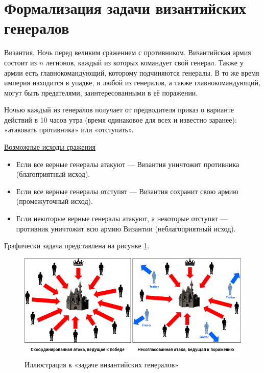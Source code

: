 \section{Формализация задачи византийских генералов}

\hspace{1.25cm}
Византия. Ночь перед великим сражением с противником. Византийская армия состоит из \(n\) легионов, каждый из которых командует свой генерал. Также у армии есть главнокомандующий, которому подчиняются генералы. В то же время империя находится в упадке, и любой из генералов, а также главнокомандующий, могут быть предателями, заинтересованными в её поражении.

Ночью каждый из генералов получает от предводителя приказ о варианте действий в 10 часов утра (время одинаковое для всех и известно заранее): «атаковать противника» или «отступать».

\underline{Возможные исходы сражения}

\begin{itemize}
    \item Если все верные генералы атакуют — Византия уничтожит противника (благоприятный исход).
    \item Если все верные генералы отступят — Византия сохранит свою армию (промежуточный исход).
    \item Если некоторые верные генералы атакуют, а некоторые отступят — противник уничтожит всю армию Византии (неблагоприятный исход).
\end{itemize}

Графически задача представлена на рисунке \ref{fig:byzantine}. 

\begin{figure}[h]
    \centering
    \includegraphics[width=\textwidth]{img/byzantine_generals.png} %
    \caption{Иллюстрация к «задаче византийских генералов»}
    \label{fig:byzantine}
\end{figure}

